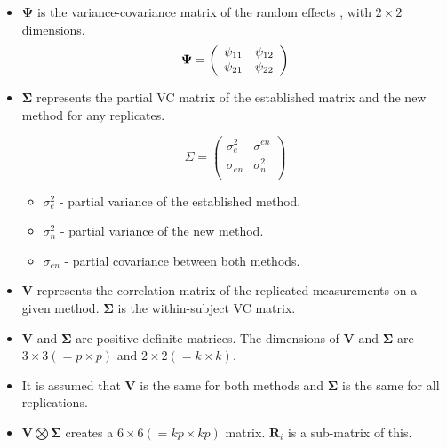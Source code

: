 \documentclass[12pt, a4paper]{article}
\begin{document}
\begin{itemize}
	\item $\boldsymbol{\Psi}$ is the variance-covariance matrix of the random effects ,
	with $2 \times 2$ dimensions.
	\begin{equation}
	\boldsymbol{\Psi} =
	\left(%
	\begin{array}{c c}
	\psi_{11} & \psi_{12}  \\
	\psi_{21} & \psi_{22}  \\
	\end{array}%
	\right)
	\end{equation}
	
	\item  $\boldsymbol{\Sigma}$ represents the partial VC matrix of
	the established matrix and the new method for any replicates.
	
	\begin{equation}
	\Sigma = \left( \begin{array}{cc}
	\sigma^2_{e} & \sigma^{en} \\
	\sigma_{en} & \sigma^2_{n} \\
	\end{array}\right)
	\end{equation}
	
	\begin{itemize}
		\item $\sigma^2_{e}$ - partial variance of the established method.
		\item $\sigma^2_{n}$ - partial variance of the new method.
		\item $\sigma_{en}$ - partial covariance between both methods.
	\end{itemize}
	
	\item $\boldsymbol{V}$ represents the correlation matrix of the replicated measurements on a given method.
	$\boldsymbol{\Sigma}$ is the within-subject VC matrix.
	
	\item $\boldsymbol{V}$ and $\boldsymbol{\Sigma}$ are positive
	definite matrices. The dimensions of $\boldsymbol{V}$ and
	$\boldsymbol{\Sigma}$ are $3 \times 3 ( = p \times p )$ and $ 2 \times
	2 (= k \times k)$.
	
	\item It is assumed that $\boldsymbol{V}$ is the same for both methods and $\boldsymbol{\Sigma}$ is
	the same for all replications.
	
	\item $\boldsymbol{V} \bigotimes \boldsymbol{\Sigma}$ creates a $ 6 \times 6 ( = kp \times
	kp)$ matrix.
	$\boldsymbol{R}_{i}$ is a sub-matrix of this.
	

\end{itemize}
\end{document}
